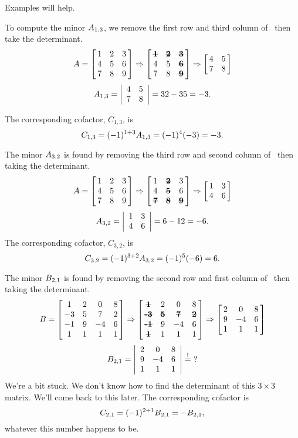 Examples will help.\\

{To compute the minor $\tta_{1,3}$, we remove the first row and third column of \tta\ then take the determinant. 
$$\tta = \bmx{ccc}1&2&3\\4&5&6\\7&8&9\emx\Rightarrow\bmx{ccc}\textbf{\sout{1}}&\textbf{\sout{2}}&\textbf{\sout{3}}\\4&5&\textbf{\sout{6}}\\7&8&\textbf{\sout{9}}\emx\Rightarrow\bmx{cc}4&5\\7&8\emx $$
$$\tta_{1,3} = \bdt{cc}4&5\\7&8\edt = 32-35 = -3.$$
 
The corresponding cofactor, $C_{1,3}$, is
$$C_{1,3} = (-1)^{1+3}\tta_{1,3} = (-1)^4(-3) = -3.$$

The minor $\tta_{3,2}$ is found by removing the third row and second column of \tta\ then taking the determinant.
$$\tta = \bmx{ccc}1&2&3\\4&5&6\\7&8&9\emx\Rightarrow\bmx{ccc}1&\textbf{\sout{2}}&3\\4&\textbf{\sout{5}}&6\\ \textbf{\sout{7}}&\textbf{\sout{8}}&\textbf{\sout{9}}\emx\Rightarrow \bmx{cc}1&3\\4&6\emx$$
$$\tta_{3,2} = \bdt{cc}1&3\\4&6\edt = 6-12 = -6.$$ 
The corresponding cofactor, $C_{3,2}$, is
$$C_{3,2} = (-1)^{3+2}\tta_{3,2} = (-1)^5(-6) = 6.$$

\drawexampleline%

The minor $\ttb_{2,1}$ is found by removing the second row and first column of \ttb\ then taking the determinant.
$$\ttb = \bmx{cccc}1&2&0&8\\-3&5&7&2\\-1&9&-4&6\\1&1&1&1\emx \Rightarrow \bmx{cccc}\textbf{\sout{1}}&2&0&8\\ \textbf{\sout{-3}}&\textbf{\sout{5}}&\textbf{\sout{7}}&\textbf{\sout{2}}\\ \textbf{\sout{-1}}&9&-4&6\\ \textbf{\sout{1}}&1&1&1\emx \Rightarrow \bmx{ccc}2&0&8\\9&-4&6\\1&1&1\emx $$
$$\ttb_{2,1} = \bdt{ccc}2&0&8\\9&-4&6\\1&1&1\edt \stackrel{!}{=} \ ?$$
We're a bit stuck. We don't know how to find the determinant of this $3\times 3$ matrix. We'll come back to this later. The corresponding cofactor is
$$C_{2,1} = (-1)^{2+1}\ttb_{2,1} = -\ttb_{2,1},$$ whatever this number happens to be.


}
